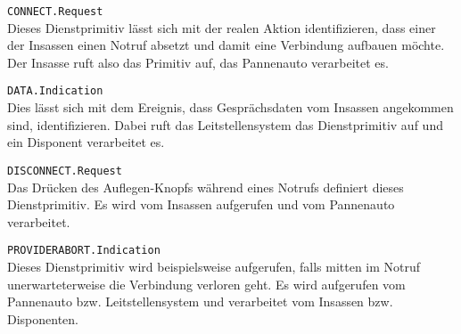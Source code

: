 \documentclass{../exercisesheet}
\begin{document}
\begin{exercise}{2}
	\begin{subexercise} \texttt{CONNECT.Request}\\
		Dieses Dienstprimitiv lässt sich mit der realen Aktion identifizieren, dass einer der Insassen einen Notruf absetzt und damit eine Verbindung aufbauen möchte. Der
		Insasse ruft also das Primitiv auf, das Pannenauto verarbeitet es.
	\end{subexercise}

	\begin{subexercise} \texttt{DATA.Indication}\\
		Dies lässt sich mit dem Ereignis, dass Gesprächsdaten vom Insassen angekommen sind, identifizieren. Dabei ruft das Leitstellensystem das Dienstprimitiv auf und
		ein Disponent verarbeitet es.
	\end{subexercise}

	\begin{subexercise} \texttt{DISCONNECT.Request}\\
		Das Drücken des Auflegen-Knopfs während eines Notrufs definiert dieses Dienstprimitiv. Es wird vom Insassen aufgerufen und vom Pannenauto verarbeitet.
	\end{subexercise}

	\begin{subexercise} \texttt{PROVIDERABORT.Indication}\\
		  Dieses Dienstprimitiv wird beispielsweise aufgerufen, falls mitten im Notruf unerwarteterweise die Verbindung verloren geht. Es wird aufgerufen vom Pannenauto
		bzw. Leitstellensystem und verarbeitet vom Insassen bzw. Disponenten.
	\end{subexercise}
\end{exercise}

\begin{exercise}{1.5}
	
\end{exercise}

\begin{exercise}{3.5}
	\begin{subexercise}
		
	\end{subexercise}

	\begin{subexercise}
		  
	\end{subexercise}
\end{exercise}
\end{document}

